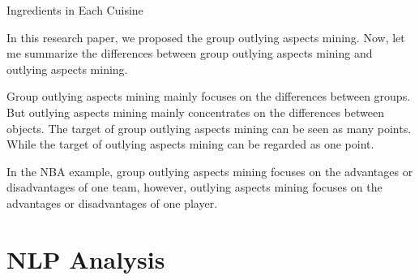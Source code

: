 \documentclass[
 size=14pt,
 paper=smartboard,  %
 mode=present, 		%
 display=slides, 	%
 style=tuliplab,  	%
 pauseslide,
 fleqn,leqno]{powerdot}
\begin{document}
\begin{slide}[toc=,bm=]{Ingredients in Each Cuisine}
  \begin{note}
  In this research paper,
  we proposed the group outlying aspects mining.
  Now,
  let me summarize the differences between group outlying aspects mining and outlying aspects mining.
  
  Group outlying aspects mining mainly focuses on the differences between groups.
  But outlying aspects mining mainly concentrates on the differences between objects.
  The target of group outlying aspects mining can be seen as many points.
  While the target of outlying aspects mining can be regarded as one point.
  
  In the NBA example,
  group outlying aspects mining focuses on the advantages
  or disadvantages of one team,
  however,
  outlying aspects mining focuses on the advantages or disadvantages of one player.
  \end{note}
  
  \end{slide}

  
\section{NLP Analysis}
\end{document}
